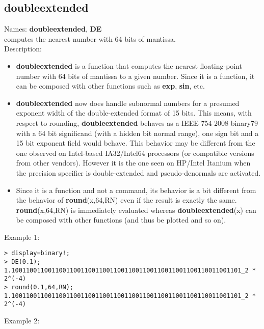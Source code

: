 \subsection{doubleextended}
\label{labdoubleextended}
\noindent Names: \textbf{doubleextended}, \textbf{DE}\\
computes the nearest number with 64 bits of mantissa.\\
\noindent Description: \begin{itemize}

\item \textbf{doubleextended} is a function that computes the nearest floating-point number with
   64 bits of mantissa to a given number. Since it is a function, it can be
   composed with other \sollya functions such as \textbf{exp}, \textbf{sin}, etc.

\item \textbf{doubleextended} now does handle subnormal numbers for a presumed exponent width
   of the double-extended format of 15 bits. This means, with respect to 
   rounding, \textbf{doubleextended} behaves as a IEEE 754-2008 binary79 with a 64 bit 
   significand (with a hidden bit normal range), one sign bit and a 
   15 bit exponent field would behave. This behavior may be different
   from the one observed on Intel-based IA32/Intel64 processors (or compatible
   versions from other vendors). However it is the one seen on HP/Intel 
   Itanium when the precision specifier is double-extended and pseudo-denormals
   are activated.

\item Since it is a function and not a command, its behavior is a bit different from 
   the behavior of \textbf{round}(x,64,RN) even if the result is exactly the same.
   \textbf{round}(x,64,RN) is immediately evaluated whereas \textbf{doubleextended}(x) can be composed 
   with other functions (and thus be plotted and so on).
\end{itemize}
\noindent Example 1: 
\begin{center}\begin{minipage}{15cm}\begin{Verbatim}[frame=single]
> display=binary!;
> DE(0.1);
1.100110011001100110011001100110011001100110011001100110011001101_2 * 2^(-4)
> round(0.1,64,RN);
1.100110011001100110011001100110011001100110011001100110011001101_2 * 2^(-4)
\end{Verbatim}
\end{minipage}\end{center}
\noindent Example 2: 
